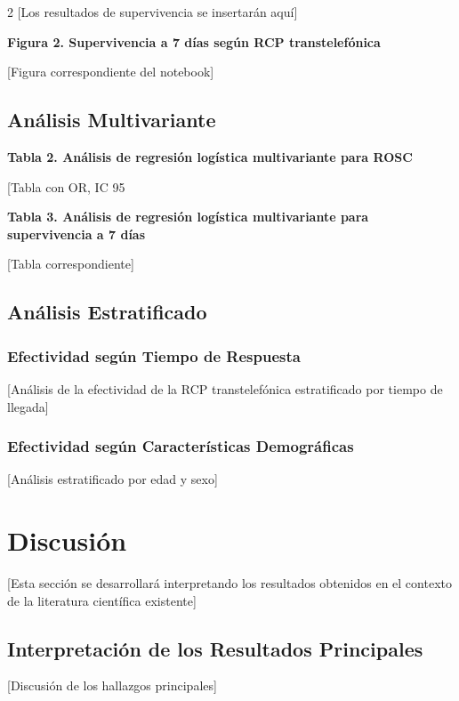 \documentclass[10pt,a4paper]{article}
\begin{document}
\begin{multicols}{2}
[Los resultados de supervivencia se insertarán aquí]

\textbf{Figura 2. Supervivencia a 7 días según RCP transtelefónica}

[Figura correspondiente del notebook]

\subsection{Análisis Multivariante}

\textbf{Tabla 2. Análisis de regresión logística multivariante para ROSC}

[Tabla con OR, IC 95%

\textbf{Tabla 3. Análisis de regresión logística multivariante para supervivencia a 7 días}

[Tabla correspondiente]

\subsection{Análisis Estratificado}

\subsubsection{Efectividad según Tiempo de Respuesta}

[Análisis de la efectividad de la RCP transtelefónica estratificado por tiempo de llegada]

\subsubsection{Efectividad según Características Demográficas}

[Análisis estratificado por edad y sexo]

\section{Discusión}

[Esta sección se desarrollará interpretando los resultados obtenidos en el contexto de la literatura científica existente]

\subsection{Interpretación de los Resultados Principales}

[Discusión de los hallazgos principales]


\end{multicols}
\end{document}
